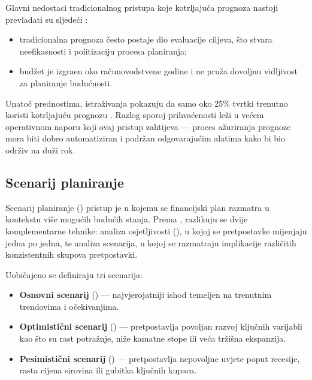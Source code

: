 \documentclass[zavrsnirad]{fer}
\begin{document}
Glavni nedostaci tradicionalnog pristupa koje kotrljaju\'{c}a prognoza nastoji prevladati su sljede\'{c}i \citep{melnychuk2019rolling}:
\begin{itemize}
    \item tradicionalna prognoza \v{c}esto postaje dio evaluacije ciljeva, \v{s}to stvara neefikasnosti i politizaciju procesa planiranja;
    \item bud\v{z}et je izgra\dj en oko ra\v{c}unovodstvene godine i ne pru\v{z}a dovoljnu vidljivost za planiranje budu\'{c}nosti.
\end{itemize}

Unato\v{c} prednostima, istra\v{z}ivanja pokazuju da samo oko 25\% tvrtki trenutno koristi kotrljaju\'{c}u prognozu \citep{melnychuk2019rolling}. Razlog sporoj prihva\'{c}enosti le\v{z}i u ve\'{c}em operativnom naporu koji ovaj pristup zahtijeva --- proces a\v{z}uriranja prognoze mora biti dobro automatiziran i podr\v{z}an odgovaraju\'{c}im alatima kako bi bio odr\v{z}iv na du\v{z}i rok.

\subsection{Scenarij planiranje}
\label{subsec:scenarij_planiranje}

Scenarij planiranje () pristup je u kojemu se financijski plan razmatra u kontekstu vi\v{s}e mogu\'{c}ih budu\'{c}ih stanja. Prema \cite{brealey2020principles}, razlikuju se dvije komplementarne tehnike: analiza osjetljivosti (), u kojoj se pretpostavke mijenjaju jedna po jedna, te analiza scenarija, u kojoj se razmatraju implikacije razli\v{c}itih konzistentnih skupova pretpostavki.

Uobi\v{c}ajeno se definiraju tri scenarija:
\begin{itemize}
    \item \textbf{Osnovni scenarij} () --- najvjerojatniji ishod temeljen na trenutnim trendovima i o\v{c}ekivanjima.
    \item \textbf{Optimisti\v{c}ni scenarij} () --- pretpostavlja povoljan razvoj klju\v{c}nih varijabli kao \v{s}to su rast potra\v{z}nje, ni\v{z}e kamatne stope ili ve\'{c}a tr\v{z}i\v{s}na ekspanzija.
    \item \textbf{Pesimisti\v{c}ni scenarij} () --- pretpostavlja nepovoljne uvjete poput recesije, rasta cijena sirovina ili gubitka klju\v{c}nih kupaca.
\end{itemize}
\end{document}
